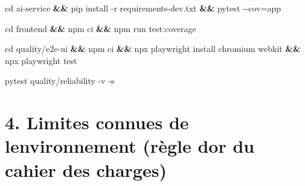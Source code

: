 \documentclass[
  11pt,
]{article}
\newenvironment{Shaded}{}{}
\newcommand{\AttributeTok}[1]{\textcolor[rgb]{0.49,0.56,0.16}{#1}}
\newcommand{\BuiltInTok}[1]{\textcolor[rgb]{0.00,0.50,0.00}{#1}}
\newcommand{\ExtensionTok}[1]{#1}
\newcommand{\KeywordTok}[1]{\textcolor[rgb]{0.00,0.44,0.13}{\textbf{#1}}}
\newcommand{\NormalTok}[1]{#1}
\newcommand{\OperatorTok}[1]{\textcolor[rgb]{0.40,0.40,0.40}{#1}}
\begin{document}
\begin{Shaded}
\begin{Highlighting}[]
\BuiltInTok{cd}\NormalTok{ ai{-}service }\KeywordTok{\&\&} \ExtensionTok{pip}\NormalTok{ install }\AttributeTok{{-}r}\NormalTok{ requirements{-}dev.txt }\KeywordTok{\&\&} \ExtensionTok{pytest} \AttributeTok{{-}{-}cov}\OperatorTok{=}\NormalTok{app}
\end{Highlighting}
\end{Shaded}

\begin{Shaded}
\begin{Highlighting}[]
\BuiltInTok{cd}\NormalTok{ frontend }\KeywordTok{\&\&} \ExtensionTok{npm}\NormalTok{ ci }\KeywordTok{\&\&} \ExtensionTok{npm}\NormalTok{ run test:coverage}
\end{Highlighting}
\end{Shaded}

\begin{Shaded}
\begin{Highlighting}[]
\BuiltInTok{cd}\NormalTok{ quality/e2e{-}ui }\KeywordTok{\&\&} \ExtensionTok{npm}\NormalTok{ ci }\KeywordTok{\&\&} \ExtensionTok{npx}\NormalTok{ playwright install chromium webkit }\KeywordTok{\&\&} \ExtensionTok{npx}\NormalTok{ playwright test}
\end{Highlighting}
\end{Shaded}

\begin{Shaded}
\begin{Highlighting}[]
\ExtensionTok{pytest}\NormalTok{ quality/reliability }\AttributeTok{{-}v} \AttributeTok{{-}s}
\end{Highlighting}
\end{Shaded}

\section{4. Limites connues de l\textquotesingle environnement (règle
d\textquotesingle or du cahier des
charges)}\label{4-limites-connues-de-lenvironnement-ruxe8gle-dor-du-cahier-des-charges}
\end{document}

